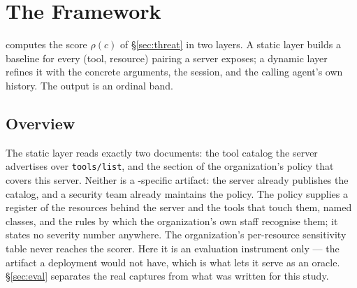 %
%
%
%
%
\section{The Framework}
\label{sec:framework}

\framework{} computes the score $\rho(c)$ of \S\ref{sec:threat} in two layers.
A static layer builds a baseline for every (tool, resource) pairing a server
exposes; a dynamic layer refines it with the concrete arguments,
the session, and the calling agent's own history. The output is an ordinal
band.

\subsection{Overview}

The static layer reads exactly two documents: the tool catalog the server
advertises over \texttt{tools/list}, and the section of the organization's
policy that covers this server. Neither is a \framework{}-specific artifact:
the server already publishes the catalog, and a security team already maintains
the policy. The policy supplies a register of the resources behind the server
and the tools that touch them, named classes, and
the rules by which the organization's own staff recognise them; it states no
severity number anywhere. The organization's per-resource sensitivity table
never reaches the scorer. Here it is an evaluation instrument only --- the
artifact a deployment would not have, which is what lets it serve as an oracle.
\S\ref{sec:eval} separates the real captures from what was written for this
study.

